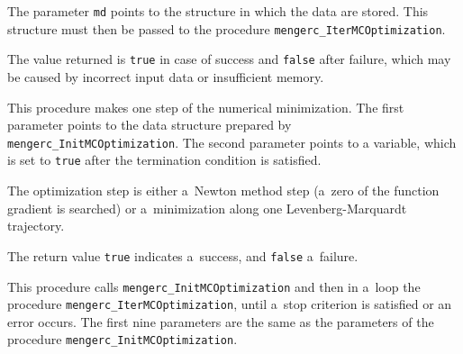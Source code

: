 The parameter \texttt{md} points to the structure in which the data are
stored. This structure must then be passed to the procedure
\texttt{mengerc\_IterMCOptimization}.

The value returned is \texttt{true} in case of success and \texttt{false}
after failure, which may be caused by incorrect input data or insufficient
memory.


\vspace{\medskipamount}

This procedure makes one step of the numerical minimization. The first
parameter points to the data structure prepared by
\texttt{mengerc\_InitMCOptimization}. The second parameter points to a
variable, which is set to \texttt{true} after the termination condition is
satisfied.

The optimization step is either a~Newton method step (a~zero of the function
gradient is searched) or a~minimization along one Levenberg-Marquardt
trajectory.

The return value \texttt{true} indicates a~success, and \texttt{false}
a~failure.

\vspace{\medskipamount}

This procedure calls \texttt{mengerc\_InitMCOptimization} and then in a~loop
the procedure \texttt{mengerc\_IterMCOptimization}, until a~stop criterion is
satisfied or an error occurs. The first nine parameters are the same as the
parameters of the procedure
\texttt{mengerc\_InitMCOptimization}.

